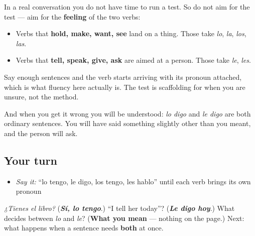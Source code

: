 \begin{grammarlens}[title={Grammar Lens: choosing at speed}]
In a real conversation you do not have time to run a test. So do not aim for the test — aim for the \textbf{feeling} of the two verbs:

\begin{itemize}
\raggedright
  \item Verbs that \textbf{hold, make, want, see} land on a thing. Those take \emph{lo}, \emph{la}, \emph{los}, \emph{las}.
  \item Verbs that \textbf{tell, speak, give, ask} are aimed at a person. Those take \emph{le}, \emph{les}.
\end{itemize}

Say enough sentences and the verb starts arriving with its pronoun attached, which is what fluency here actually is. The test is scaffolding for when you are unsure, not the method.

And when you get it wrong you will be understood: \emph{lo digo} and \emph{le digo} are both ordinary sentences. You will have said something slightly other than you meant, and the person will ask.
\end{grammarlens}

\subsection*{Your turn}
\begin{itemize}
\raggedright
  \item \emph{Say it:} \textquotedblleft{}lo tengo, le digo, los tengo, les hablo\textquotedblright{} until each verb brings its own pronoun
\end{itemize}

\begin{tcolorbox}[breakable,colback=teal!4,colframe=teal!35!black,title={Before you move on}]
\emph{¿Tienes el libro?} (\emph{\textbf{Sí, lo tengo}}.) \textquotedblleft{}I tell her today\textquotedblright{}? (\emph{\textbf{Le digo hoy}}.) What decides between \emph{lo} and \emph{le}? (\textbf{What you mean} — nothing on the page.) Next: what happens when a sentence needs \textbf{both} at once.
\end{tcolorbox}
